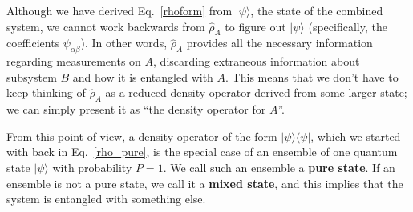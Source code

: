 \documentclass[pra,12pt]{revtex4-2}
\begin{document}
Although we have derived Eq.~\eqref{rhoform} from $|\psi\rangle$, the
state of the combined system, we cannot work backwards from
$\hat{\rho}_A$ to figure out $|\psi\rangle$ (specifically, the
coefficients $\psi_{\alpha\beta}$).  In other words, $\hat{\rho}_A$
provides all the necessary information regarding measurements on $A$,
discarding extraneous information about subsystem $B$ and how it is
entangled with $A$.  This means that we don't have to keep thinking of
$\hat{\rho}_A$ as a reduced density operator derived from some larger
state; we can simply present it as ``the density operator for $A$''.

From this point of view, a density operator of the form
$|\psi\rangle\langle\psi|$, which we started with back in
Eq.~\eqref{rho_pure}, is the special case of an ensemble of one
quantum state $|\psi\rangle$ with probability $P = 1$.  We call such
an ensemble a \textbf{pure state}.  If an ensemble is not a pure
state, we call it a \textbf{mixed state}, and this implies that the
system is entangled with something else.
\end{document}
